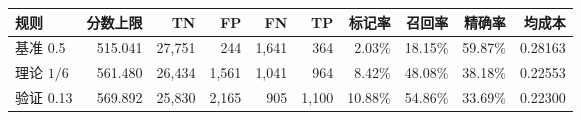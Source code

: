 \begin{tabular}{lrrrrrrrrr}
\toprule
规则 & 分数上限 & TN & FP & FN & TP & 标记率 & 召回率 & 精确率 & 均成本 \\
\midrule
基准 0.5 & 515.041 & 27,751 & 244 & 1,641 & 364 & 2.03\% & 18.15\% & 59.87\% & 0.28163 \\
理论 $1/6$ & 561.480 & 26,434 & 1,561 & 1,041 & 964 & 8.42\% & 48.08\% & 38.18\% & 0.22553 \\
验证 0.13 & 569.892 & 25,830 & 2,165 & 905 & 1,100 & 10.88\% & 54.86\% & 33.69\% & 0.22300 \\
\bottomrule
\end{tabular}
